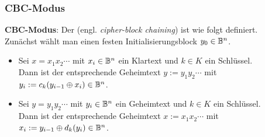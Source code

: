 \pagebreak

\subsubsection{%
    CBC-Modus%
}

\textbf{CBC-Modus}:
Der  (engl. \emph{cipher-block chaining}) ist wie folgt definiert.\\
Zunächst wählt man einen festen Initialisierungsblock $y_0 \in \mathbb{B}^n$.
\begin{itemize}
    \item
    Sei $x = x_1 x_2 \cdots$ mit $x_i \in \mathbb{B}^n$ ein Klartext und $k \in K$ ein Schlüssel.\\
    Dann ist der entsprechende Geheimtext $y := y_1 y_2 \cdots$ mit
    $y_i := c_k(y_{i-1} \oplus x_i) \in \mathbb{B}^n$.
    
    \item
    Sei $y = y_1 y_2 \cdots$ mit $y_i \in \mathbb{B}^n$ ein Geheimtext und $k \in K$ ein Schlüssel.\\
    Dann ist der entsprechende Geheimtext $x := x_1 x_2 \cdots$ mit
    $x_i := y_{i-1} \oplus d_k(y_i) \in \mathbb{B}^n$.
\end{itemize}
